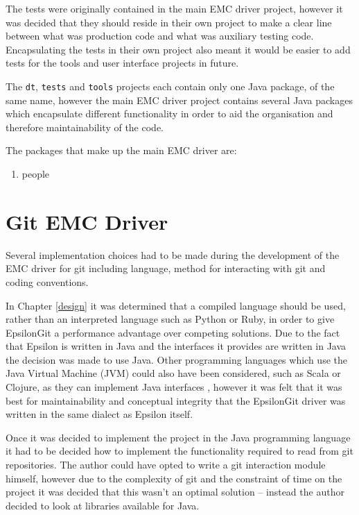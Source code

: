 \documentclass[11pt]{book}
\newcommand{\code}[1]{\texttt{#1}}
\begin{document}
The tests were originally contained in the main EMC driver project, however it was decided that they should reside in their own project to make a clear line between what was production code and what was auxiliary testing code. Encapsulating the tests in their own project also meant it would be easier to add tests for the tools and user interface projects in future.

The \code{dt}, \code{tests} and \code{tools} projects each contain only one Java package, of the same name, however the main EMC driver project contains several Java packages which encapsulate different functionality in order to aid the organisation and therefore maintainability of the code.

The packages that make up the main EMC driver are:

\begin{enumerate}
	\item people
\end{enumerate}

\section{Git EMC Driver}
Several implementation choices had to be made during the development of the EMC driver for git including language, method for interacting with git and coding conventions. 

In Chapter \ref{design} it was determined that a compiled language should be used, rather than an interpreted language such as Python or Ruby, in order to give EpsilonGit a performance advantage over competing solutions. Due to the fact that Epsilon is written in Java and the interfaces it provides are written in Java the decision was made to use Java. Other programming languages which use the Java Virtual Machine (JVM) could also have been considered, such as Scala or Clojure, as they can implement Java interfaces \cite{scalacookbook}, however it was felt that it was best for maintainability and conceptual integrity that the EpsilonGit driver was written in the same dialect as Epsilon itself.

Once it was decided to implement the project in the Java programming language it had to be decided how to implement the functionality required to read from git repositories. The author could have opted to write a git interaction module himself, however due to the complexity of git and the constraint of time on the project it was decided that this wasn't an optimal solution -- instead the author decided to look at libraries available for Java. 
\end{document}
